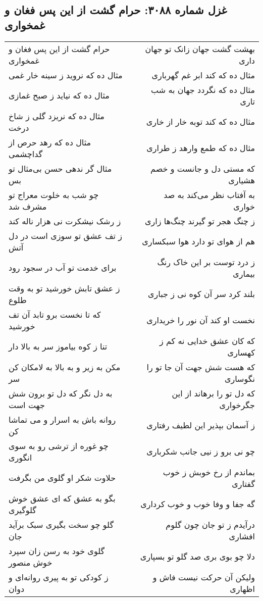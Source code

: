 \begin{center}
\section*{غزل شماره ۳۰۸۸: حرام گشت از این پس فغان و غمخواری}
\label{sec:3088}
\begin{longtable}{l p{0.5cm} r}
حرام گشت از این پس فغان و غمخواری
&&
بهشت گشت جهان زانک تو جهان داری
\\
مثال ده که نروید ز سینه خار غمی
&&
مثال ده که کند ابر غم گهرباری
\\
مثال ده که نیاید ز صبح غمازی
&&
مثال ده که نگردد جهان به شب تاری
\\
مثال ده که نریزد گلی ز شاخ درخت
&&
مثال ده که کند توبه خار از خاری
\\
مثال ده که رهد حرص از گداچشمی
&&
مثال ده که طمع وارهد ز طراری
\\
مثال گر ندهی حسن بی‌مثال تو بس
&&
که مستی دل و جانست و خصم هشیاری
\\
چو شب به خلوت معراج تو مشرف شد
&&
به آفتاب نظر می‌کند به صد خواری
\\
ز رشک نیشکرت نی هزار ناله کند
&&
ز چنگ هجر تو گیرند چنگ‌ها زاری
\\
ز تف عشق تو سوزی است در دل آتش
&&
هم از هوای تو دارد هوا سبکساری
\\
برای خدمت تو آب در سجود رود
&&
ز درد توست بر این خاک رنگ بیماری
\\
ز عشق تابش خورشید تو به وقت طلوع
&&
بلند کرد سر آن کوه نی ز جباری
\\
که تا نخست برو تابد آن تف خورشید
&&
نخست او کند آن نور را خریداری
\\
تنا ز کوه بیاموز سر به بالا دار
&&
که کان عشق خدایی نه کم ز کهساری
\\
مکن به زیر و به بالا به لامکان کن سر
&&
که هست شش جهت آن جا تو را نگوساری
\\
به دل نگر که دل تو برون شش جهت است
&&
که دل تو را برهاند از این جگرخواری
\\
روانه باش به اسرار و می تماشا کن
&&
ز آسمان بپذیر این لطیف رفتاری
\\
چو غوره از ترشی رو به سوی انگوری
&&
چو نی برو ز نیی جانب شکرباری
\\
حلاوت شکر او گلوی من بگرفت
&&
بماندم از رخ خوبش ز خوب گفتاری
\\
بگو به عشق که ای عشق خوش گلوگیری
&&
گه جفا و وفا خوب و خوب کرداری
\\
گلو چو سخت بگیری سبک برآید جان
&&
درآیدم ز تو جان چون گلوم افشاری
\\
گلوی خود به رسن زان سپرد خوش منصور
&&
دلا چو بوی بری صد گلو تو بسپاری
\\
ز کودکی تو به پیری روانه‌ای و دوان
&&
ولیکن آن حرکت نیست فاش و اظهاری
\\
\end{longtable}
\end{center}
